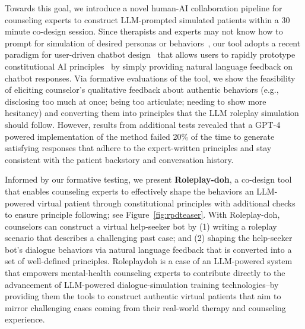 Towards this goal, we introduce a novel human-AI collaboration pipeline for 
counseling experts to construct LLM-prompted simulated patients within a 30 minute co-design session. Since therapists and experts may not know how to prompt for simulation of desired personas or behaviors~\cite{whyjohnnycantprompt}, our tool adopts a recent paradigm for user-driven chatbot design~\cite{petridis2023constitutionmaker} that allows users to rapidly prototype constitutional AI principles~\cite{bai2022constitutional} by simply providing natural language feedback on chatbot responses.  Via formative evaluations of the tool, we show the feasibility of eliciting counselor's qualitative feedback about authentic behaviors (e.g., disclosing too much at once;  being too articulate; needing to show more hesitancy) and converting them into principles that the LLM roleplay simulation should follow. However, results from additional tests revealed that a GPT-4 powered implementation of the method failed 20\% of the time to generate satisfying responses that adhere to the expert-written principles and stay consistent with the patient backstory and conversation history. 





Informed by our formative testing, we present \textbf{Roleplay-doh}, a co-design tool that enables counseling experts to effectively shape the behaviors an LLM-powered virtual patient through constitutional principles with additional checks to ensure principle following; see Figure~\ref{fig:rpdteaser}.  With Roleplay-doh, counselors can construct a virtual help-seeker bot by (1) writing a roleplay scenario that describes a challenging past case; and (2) shaping the help-seeker bot's dialogue behaviors via natural language feedback that is converted into a set of well-defined principles. Roleplaydoh is a case of an LLM-powered system that empowers mental-health counseling experts to contribute directly to the advancement of LLM-powered dialogue-simulation training technologies--by providing them the tools to construct authentic virtual patients that aim to mirror challenging cases coming from their real-world therapy and counseling experience.   

